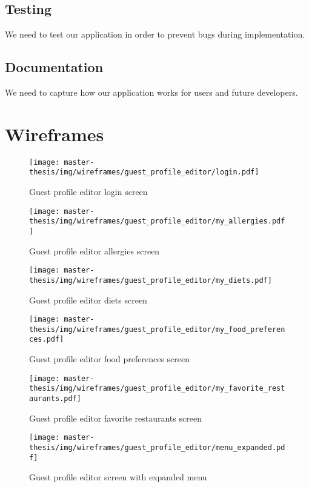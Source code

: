 \subsection{Testing}
We need to test our application in order to prevent bugs during implementation.

\subsection{Documentation}
We need to capture how our application works for users and future developers.

\section{Wireframes}
\begin{figure}[h]
  \centering
  \texttt{[image: master-thesis/img/wireframes/guest\_profile\_editor/login.pdf]}
  \caption{Guest profile editor login screen}
\end{figure}

\begin{figure}[h]
  \centering
  \texttt{[image: master-thesis/img/wireframes/guest\_profile\_editor/my\_allergies.pdf]}
  \caption{Guest profile editor allergies screen}
\end{figure}

\begin{figure}[h]
  \centering
  \texttt{[image: master-thesis/img/wireframes/guest\_profile\_editor/my\_diets.pdf]}
  \caption{Guest profile editor diets screen}
\end{figure}

\begin{figure}[h]
  \centering
  \texttt{[image: master-thesis/img/wireframes/guest\_profile\_editor/my\_food\_preferences.pdf]}
  \caption{Guest profile editor food preferences screen}
\end{figure}

\begin{figure}[h]
  \centering
  \texttt{[image: master-thesis/img/wireframes/guest\_profile\_editor/my\_favorite\_restaurants.pdf]}
  \caption{Guest profile editor favorite restaurants screen}
\end{figure}

\begin{figure}[h]
  \centering
  \texttt{[image: master-thesis/img/wireframes/guest\_profile\_editor/menu\_expanded.pdf]}
  \caption{Guest profile editor screen with expanded menu}
\end{figure}

\listoftodos